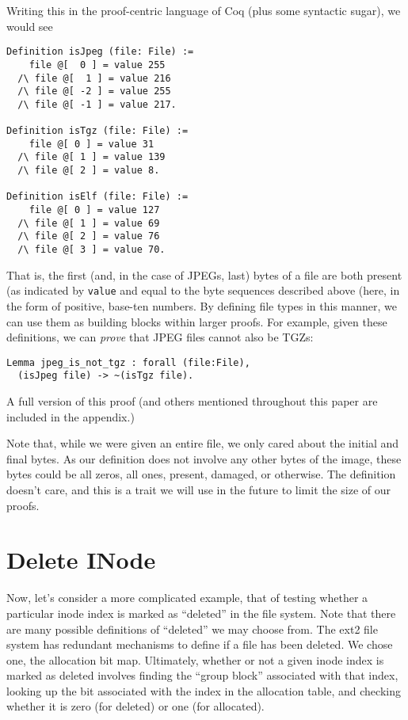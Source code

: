 \documentclass[nocopyrightspace]{sigplanconf}
\begin{document}
Writing this in the proof-centric language of Coq (plus some syntactic sugar),
we would see

\begin{lstlisting}
Definition isJpeg (file: File) :=
    file @[  0 ] = value 255
  /\ file @[  1 ] = value 216 
  /\ file @[ -2 ] = value 255
  /\ file @[ -1 ] = value 217.

Definition isTgz (file: File) :=
    file @[ 0 ] = value 31
  /\ file @[ 1 ] = value 139 
  /\ file @[ 2 ] = value 8.

Definition isElf (file: File) :=
    file @[ 0 ] = value 127
  /\ file @[ 1 ] = value 69 
  /\ file @[ 2 ] = value 76
  /\ file @[ 3 ] = value 70.
\end{lstlisting}

That is, the first (and, in the case of JPEGs, last) bytes of a file are both
present (as indicated by {\tt value} and equal to the byte sequences described
above (here, in the form of positive, base-ten numbers. By defining file types
in this manner, we can use them as building blocks within larger proofs. For
example, given these definitions, we can {\it prove} that JPEG files cannot
also be TGZs:

\begin{lstlisting}
Lemma jpeg_is_not_tgz : forall (file:File),
  (isJpeg file) -> ~(isTgz file).
\end{lstlisting}

A full version of this proof (and others mentioned throughout this paper are
included in the appendix.)

Note that, while we were given an entire file, we only cared about the initial
and final bytes. As our definition does not involve any other bytes of the
image, these bytes could be all zeros, all ones, present, damaged, or
otherwise. The definition doesn't care, and this is a trait we will use in the
future to limit the size of our proofs.

\section{Delete INode}

Now, let's consider a more complicated example, that of testing whether a
particular inode index is marked as ``deleted'' in the file system. Note that
there are many possible definitions of ``deleted'' we may choose from. The
ext2 file system has redundant mechanisms to define if a file has been
deleted. We chose one, the allocation bit map. Ultimately, whether or not a
given inode index is marked as deleted involves finding the ``group block''
associated with that index, looking up the bit associated with the index in
the allocation table, and checking whether it is zero (for deleted) or one
(for allocated).
\end{document}
